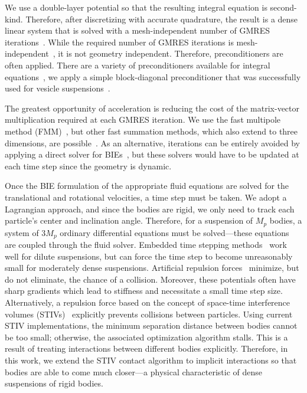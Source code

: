 \documentclass[preprint, 10pt]{elsarticle}
\begin{document}
We use a double-layer potential so that the resulting integral equation
is second-kind.  Therefore, after discretizing with accurate quadrature,
the result is a dense linear system that is solved with a
mesh-independent number of GMRES iterations~\cite{Saad1986}.  While the
required number of GMRES iterations is
mesh-independent~\cite{Campbell1996}, it is not geometry independent.
Therefore, preconditioners are often applied.  There are a variety of
preconditioners available for integral equations~\cite{cou-pou-dar2017,
che2000, qua-cou-dar2018, Quaife2015a, bra-lub1990, hem-sch1981}, we
apply a simple block-diagonal preconditioner that was successfully used
for vesicle suspensions~\cite{Quaife2014}.

The greatest opportunity of acceleration is reducing the cost of the
matrix-vector multiplication required at each GMRES iteration.  We use
the fast multipole method (FMM)~\cite{Greengard1987,Greenbaum1992},
but other fast summation methods, which also extend to three dimensions,
are possible~\cite{bar-hut1986, kli-tor2014}.  As an alternative,
iterations can be entirely avoided by applying a direct solver for
BIEs~\cite{mar-bar-gil-vee2016}, but these solvers would have to be
updated at each time step since the geometry is dynamic.

Once the BIE formulation of the appropriate fluid equations are solved
for the translational and rotational velocities, a time step must be
taken.  We adopt a Lagrangian approach, and since the bodies are rigid,
we only need to track each particle's center and inclination angle.
Therefore, for a suspension of $M_p$ bodies, a system of $3M_p$ ordinary
differential equations must be solved---these equations are coupled
through the fluid solver.  Embedded time stepping
methods~\cite{kli-tor2014} work well for dilute suspensions, but can
force the time step to become unreasonably small for moderately dense
suspensions. Artificial repulsion forces~\cite{Flormann2017, Liu2006,
Malhotra2018, Lu2017, Kabacogulu2017} minimize, but do not eliminate,
the chance of a collision. Moreover, these potentials often have sharp
gradients which lead to stiffness and necessitate a small time step
size. Alternatively, a repulsion force based on the concept of
space-time interference volumes (STIVs)~\cite{Harmon2011, Lu2017}
explicitly prevents collisions between particles.  Using current STIV
implementations, the minimum separation distance between bodies cannot
be too small; otherwise, the associated optimization algorithm stalls.
This is a result of treating interactions between different bodies
explicitly.  Therefore, in this work, we extend the STIV contact
algorithm to implicit interactions so that bodies are able to come much
closer---a physical characteristic of dense suspensions of rigid bodies.
\end{document}
